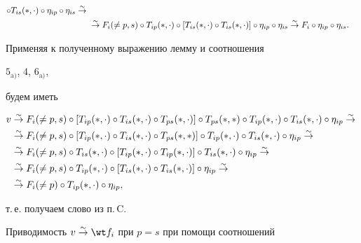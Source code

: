 \begin{pf}
\begin{align*}
[T_{ip}(*,\cdot)\circ T_{ip}(*,\cdot)]\circ 


T_{is}(*,\cdot)\circ\eta_{ip}\circ\eta_{is}\simto \\ 


&\simto F_i(\ne p,s)\circ T_{ip}(*,\cdot)\circ 


[T_{is}(*,\cdot)\circ T_{is}(*,\cdot)]\circ 


\eta_{ip}\circ\eta_{is}\simto F_i\circ\eta_{ip}\circ\eta_{is}. 


\end{align*} 


Применяя к полученному выражению лемму и соотношения 


$5_{\mathrm a)}$, $4$, $6_{\mathrm a)}$, 


будем иметь 


\begin{align*} 


v&\simto F_i(\ne p,s)\circ[T_{ip}(*,\cdot)\circ T_{is}(*,\cdot) 


\circ T_{ps}(*,\cdot)]\circ T_{ps}(*,*)\circ 


T_{ip}(*,\cdot)\circ T_{is}(*,\cdot)\circ\eta_{ip}\simto\\ 


&\simto F_i(\ne p,s)\circ[T_{ip}(*,\cdot)\circ 


T_{is}(*,\cdot)\circ T_{ps}(*,*)]\circ T_{ip}(*,\cdot) 


\circ T_{is}(*,\cdot)\circ\eta_{ip}\simto\\ 


&\simto F_i(\ne p,s)\circ T_{is}(*,\cdot)\circ 


[T_{ip}(*,\cdot)\circ T_{ip}(*,\cdot)]\circ 


T_{is}(*,\cdot)\circ\eta_{ip}\simto\\ 


%


&\simto F_i(\ne p,s)\circ T_{ip}(*,\cdot)\circ 


[T_{is}(*,\cdot)\circ T_{is}(*,\cdot)] 


\circ\eta_{ip}\simto \\ 


&\simto F_i(\ne p)\circ T_{ip}(*,\cdot)\circ\eta_{ip}, 


\end{align*} 


т.\,е. получаем слово из п.\,C. 


 


Приводимость $v\simto\wt f_i$ при $p=s$ при помощи соотношений 



\end{pf}
